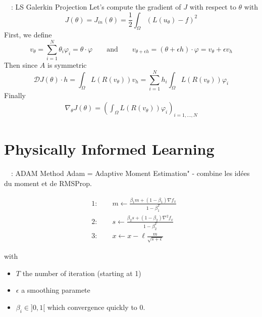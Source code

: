 \begin{frame}{\appendixname~~: LS Galerkin Projection}
	Let's compute the gradient of $J$ with respect to $\theta$ with
	\begin{equation*}
		J(\theta)=J_{in}(\theta)=\frac{1}{2}\int_\Omega (L(u_\theta) - f)^2
	\end{equation*}
	First, we define
	\begin{equation*}
		v_\theta=\sum_{i=1}^{N} \theta_i \varphi_i=\theta\cdot\varphi \qquad \text{and} \qquad v_{\theta+\epsilon h}=(\theta+\epsilon h)\cdot\varphi=v_\theta+\epsilon v_h
	\end{equation*}
	Then since $A$ is symmetric
	\begin{equation*}
		\mathcal{D}J(\theta)\cdot h = \int_\Omega L(R(v_\theta))v_h = \sum_{i=1}^N h_i\int_\Omega L(R(v_\theta))\varphi_i
	\end{equation*}
	Finally
	\begin{align*}
		\nabla_\theta J(\theta) = \left(\int_\Omega L(R(v_\theta))\varphi_i\right)_{i=1,\dots,N}
	\end{align*}
\end{frame}
\addtocounter{appendixframenumber}{1}

\section{Physically Informed Learning}

\begin{frame}{\appendixname~\theappendixframenumber~: ADAM Method}
	Adam = Adaptive Moment Estimation" - combine les idées du moment et de RMSProp.

	\begin{align*}
		&1: \qquad m \leftarrow \frac{\beta_1 m +  (1-\beta_1) \nabla f_{x}}{1-\beta_1^T}\\
		&2: \qquad s \leftarrow \frac{\beta_2 s +  (1-\beta_2) \nabla^2 f_{x}}{1-\beta_2^T}\\
		&3: \qquad x \leftarrow x-  \ell \frac{m }{\sqrt{s+\epsilon}} 
	\end{align*}

	with 
	\begin{itemize}[\textbullet]
		\item $T$ the number of iteration (starting at 1) 
		\item $\epsilon$ a smoothing paramete
		\item $\beta_i \in ]0,1[$ which convergence quickly to 0. 
	\end{itemize}	
\end{frame}
\addtocounter{appendixframenumber}{1}

